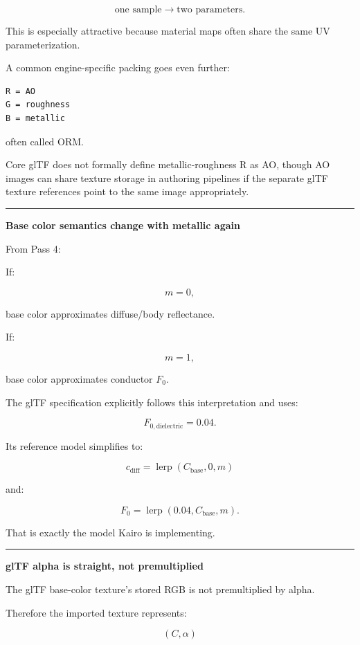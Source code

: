 \[
\text{one sample}
\rightarrow
\text{two parameters}.
\]

This is especially attractive because material maps often share the same UV parameterization.

A common engine-specific packing goes even further:

\begin{verbatim}
R = AO
G = roughness
B = metallic
\end{verbatim}

often called ORM.

Core glTF does not formally define metallic-roughness R as AO, though AO images can share texture storage in authoring pipelines if the separate glTF texture references point to the same image appropriately.

\begin{center}\rule{0.5\linewidth}{0.5pt}\end{center}

\textbf{Base color semantics change with metallic again}

From Pass 4:

If:

\[
m=0,
\]

base color approximates diffuse/body reflectance.

If:

\[
m=1,
\]

base color approximates conductor \(F_0\).

The glTF specification explicitly follows this interpretation and uses:

\[
F_{0,\text{dielectric}}=0.04.
\]

Its reference model simplifies to:

\[
c_{\text{diff}}
=
\operatorname{lerp}(C_{\text{base}},0,m)
\]

and:

\[
F_0=
\operatorname{lerp}(0.04,C_{\text{base}},m).
\]

That is exactly the model Kairo is implementing.

\begin{center}\rule{0.5\linewidth}{0.5pt}\end{center}

\textbf{glTF alpha is straight, not premultiplied}

The glTF base-color texture's stored RGB is not premultiplied by alpha.

Therefore the imported texture represents:

\[
(C,\alpha)
\]

